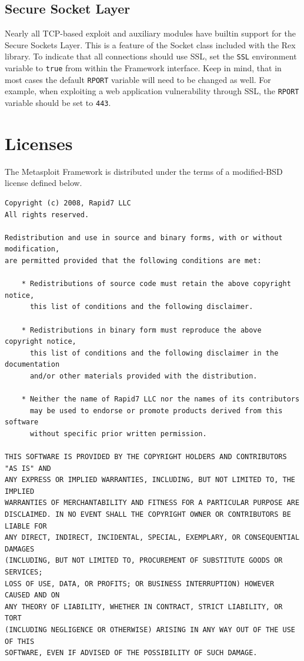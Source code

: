 \documentclass{report}
\begin{document}
	\section{Secure Socket Layer}
	\label{REF-SSL}

\par
Nearly all TCP-based exploit and auxiliary modules have builtin support for the
Secure Sockets Layer. This is a feature of the Socket class included with the
Rex library. To indicate that all connections should use SSL, set the
\texttt{SSL} environment variable to \texttt{true} from within the Framework
interface. Keep in mind, that in most cases the default \texttt{RPORT} variable
will need to be changed as well. For example, when exploiting a web application
vulnerability through SSL, the \texttt{RPORT} variable should be set to
\texttt{443}.

\pagebreak

\chapter{Licenses}

\par
The Metasploit Framework is distributed under the terms of a modified-BSD
license defined below.

{\footnotesize
\begin{verbatim}
Copyright (c) 2008, Rapid7 LLC
All rights reserved.

Redistribution and use in source and binary forms, with or without modification,
are permitted provided that the following conditions are met:

    * Redistributions of source code must retain the above copyright notice,
	  this list of conditions and the following disclaimer.

    * Redistributions in binary form must reproduce the above copyright notice,
	  this list of conditions and the following disclaimer in the documentation
	  and/or other materials provided with the distribution.

    * Neither the name of Rapid7 LLC nor the names of its contributors
	  may be used to endorse or promote products derived from this software
	  without specific prior written permission.

THIS SOFTWARE IS PROVIDED BY THE COPYRIGHT HOLDERS AND CONTRIBUTORS "AS IS" AND
ANY EXPRESS OR IMPLIED WARRANTIES, INCLUDING, BUT NOT LIMITED TO, THE IMPLIED
WARRANTIES OF MERCHANTABILITY AND FITNESS FOR A PARTICULAR PURPOSE ARE
DISCLAIMED. IN NO EVENT SHALL THE COPYRIGHT OWNER OR CONTRIBUTORS BE LIABLE FOR
ANY DIRECT, INDIRECT, INCIDENTAL, SPECIAL, EXEMPLARY, OR CONSEQUENTIAL DAMAGES
(INCLUDING, BUT NOT LIMITED TO, PROCUREMENT OF SUBSTITUTE GOODS OR SERVICES;
LOSS OF USE, DATA, OR PROFITS; OR BUSINESS INTERRUPTION) HOWEVER CAUSED AND ON
ANY THEORY OF LIABILITY, WHETHER IN CONTRACT, STRICT LIABILITY, OR TORT
(INCLUDING NEGLIGENCE OR OTHERWISE) ARISING IN ANY WAY OUT OF THE USE OF THIS
SOFTWARE, EVEN IF ADVISED OF THE POSSIBILITY OF SUCH DAMAGE.
\end{verbatim}}
\end{document}
